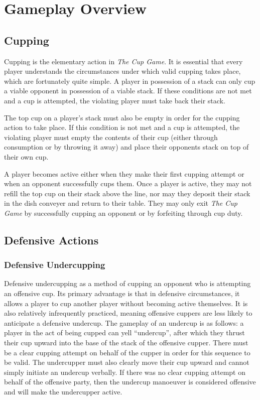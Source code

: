 \documentclass[12pt]{IEEEtran}
\begin{document}
\section{Gameplay Overview}
\label{section:gameplay}
\subsection{Cupping} Cupping is the elementary action in \textit{The Cup Game}. It is essential that every player understands the circumstances under which valid cupping takes place, which are fortunately quite simple. A player in possession of a stack can only cup a viable opponent in possession of a viable stack. If these conditions are not met and a cup is attempted, the violating player must take back their stack.

The top cup on a player's stack must also be empty in order for the cupping action to take place. If this condition is not met and a cup is attempted, the violating player must empty the contents of their cup (either through consumption or by throwing it away) and place their opponents stack on top of their own cup.

A player becomes active either when they make their first cupping attempt or when an opponent successfully cups them. Once a player is active, they may not refill the top cup on their stack above the line, nor may they deposit their stack in the dish conveyer and return to their table. They may only exit \textit{The Cup Game} by successfully cupping an opponent or by forfeiting through cup duty.
\subsection{Defensive Actions}
\subsubsection{Defensive Undercupping}\label{section:defensive_undercupping} Defensive undercupping as a method of cupping an opponent who is attempting an offensive cup. Its primary advantage is that in defensive circumstances, it allows a player to cup another player without becoming active themselves. It is also relatively infrequently practiced, meaning offensive cuppers are less likely to anticipate a defensive undercup. The gameplay of an undercup is as follows: a player in the act of being cupped can yell ``undercup'', after which they thrust their cup upward into the base of the stack of the offensive cupper. There must be a clear cupping attempt on behalf of the cupper in order for this sequence to be valid. The undercupper must also clearly move their cup upward and cannot simply initiate an undercup verbally. If there was no clear cupping attempt on behalf of the offensive party, then the undercup manoeuver is considered offensive and will make the undercupper active.   
\end{document}
